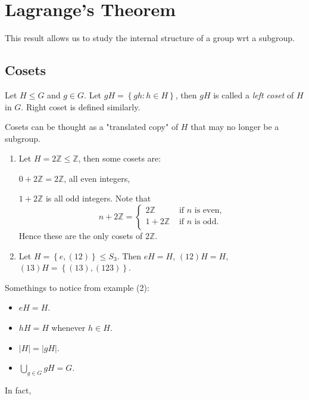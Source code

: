 \documentclass[10pt]{article}
\def\le{\leqslant}
\begin{document}
    \section{Lagrange's Theorem}
    This result allows us to study the internal structure of a group wrt a subgroup.
    \subsection{Cosets}
    \begin{definition}
        Let $H\le G$ and $g\in G$. Let $ gH=\left\{ gh:h\in H\right\} $, then $gH$ is called a \textit{left coset} of $H$ in $G$. Right coset is defined similarly.
    \end{definition}
    Cosets can be thought as a "translated copy" of $H$ that may no longer be a subgroup.
    \begin{example}
        \begin{enumerate}[(1)]
            \item Let $ H=2 \mathbb{Z} \le \mathbb{Z} $, then some cosets are: 

            $0+2\mathbb{Z}=2 \mathbb{Z}$, all even integers,

            $ 1+2 \mathbb{Z} $ is all odd integers. Note that 
            \[
                n+  2 \mathbb{Z} =\begin{cases}
                2\mathbb{Z} &\text{ if $n$ is even,}\\
                1+2\mathbb{Z} &\text{ if $n$ is odd.}\\
                \end{cases} 
            \]
            Hence these are the only cosets of $2 \mathbb{Z}$.
            \item Let $ H=\left\{ e,(12)\right\}\le S_3 $. Then $eH=H$, $ (12)H=H $, $ (13)H=\left\{ (13),(123)\right\} $.
        \end{enumerate}
    \end{example}
    Somethings to notice from example (2):
    \begin{itemize}
        \item $eH=H$.
        \item $hH=H$ whenever $h\in H$.
        \item $|H|=|gH|$.
        \item $\displaystyle \bigcup_{g\in G}gH=G$. 
    \end{itemize}
    In fact, 
\end{document}
